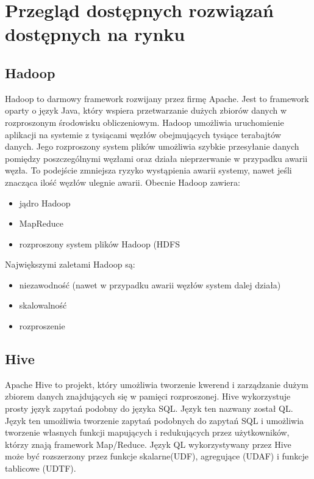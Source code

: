 \section{Przegląd dostępnych rozwiązań dostępnych na rynku}
\label{sec:solutions}

\subsection{Hadoop}
\label{sec:solutions:hadoop}
Hadoop to darmowy framework rozwijany przez firmę Apache. Jest to framework oparty o język Java, który wspiera przetwarzanie  dużych zbiorów danych w rozproszonym środowisku obliczeniowym. Hadoop umożliwia uruchomienie aplikacji na systemie z tysiącami węzłów obejmujących tysiące terabajtów danych. Jego rozproszony system plików umożliwia szybkie przesyłanie danych pomiędzy poszczególnymi węzłami oraz działa nieprzerwanie w przypadku awarii węzła. To podejście zmniejsza  ryzyko wystąpienia awarii systemy, nawet jeśli znacząca ilość węzłów ulegnie awarii. Obecnie Hadoop zawiera:

\begin{itemize}[noitemsep]
\item jądro Hadoop
\item MapReduce
\item rozproszony system plików Hadoop (HDFS
\end{itemize}

Największymi zaletami Hadoop są:
\begin{itemize}[noitemsep]
\item niezawodność (nawet w przypadku awarii węzłów system dalej działa)
\item skalowalność
\item rozproszenie
\end{itemize}

\subsection{Hive}
\label{sec:solutions:hive}
Apache Hive to projekt, który umożliwia tworzenie kwerend i zarządzanie dużym zbiorem danych znajdujących się w pamięci rozproszonej. Hive wykorzystuje prosty język zapytań podobny do języka SQL. Język ten nazwany został QL. Język ten umożliwia tworzenie zapytań podobnych do zapytań SQL i umożliwia tworzenie własnych funkcji mapujących i redukujących przez użytkowników, którzy znają framework Map/Reduce. Język QL wykorzystywany przez Hive może być rozszerzony przez funkcje skalarne(UDF), agregujące (UDAF) i funkcje tablicowe (UDTF).

